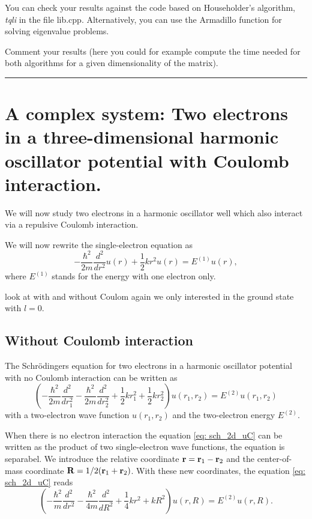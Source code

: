 \documentclass[11pt,a4wide]{article}
\begin{document}
You can check your results against the code based
on Householder's algorithm, {\em tqli} in the file lib.cpp. Alternatively, you can use the Armadillo function for solving 
eigenvalue problems. 

Comment your results (here you could for example compute the time needed for 
both algorithms for a given dimensionality of the matrix).  

\noindent\rule{\textwidth}{1pt}

\section{A complex system: Two electrons in a three-dimensional harmonic oscillator potential with Coulomb interaction.}
We will now study two electrons in a harmonic oscillator well which also interact via a repulsive Coulomb interaction.


We will now rewrite the single-electron equation as
\[
  -\frac{\hbar^2}{2 m} \frac{d^2}{dr^2} u(r) 
       + \frac{1}{2}k r^2u(r)  = E^{(1)} u(r),
\]
where $E^{(1)}$ stands for the energy with one electron only.

look at with and without Coulom
again we only interested in the ground state with $l=0$. 


\subsection{Without Coulomb interaction}
The Schr\"odingers equation for two electrons in a harmonic oscillator potential with no Coulomb interaction can be written as
\begin{equation}
\left(  -\frac{\hbar^2}{2 m} \frac{d^2}{dr_1^2} -\frac{\hbar^2}{2 m} \frac{d^2}{dr_2^2}+ \frac{1}{2}k r_1^2+ \frac{1}{2}k r_2^2\right)u(r_1,r_2)  = E^{(2)} u(r_1,r_2) 
\label{eq: sch_2d_uC}
\end{equation}
with a two-electron wave function $u(r_1,r_2)$ and the two-electron energy $E^{(2)}$.

When there is no electron interaction the equation \ref{eq: sch_2d_uC} can be written as the product of two single-electron wave functions, the equation is separabel. We introduce the relative coordinate ${\bf r} = {\bf r}_1-{\bf r}_2$ and the center-of-mass coordinate ${\bf R} = 1/2({\bf r}_1+{\bf r}_2)$. With these new coordinates, the equation \ref{eq: sch_2d_uC} reads
\[
\left(  -\frac{\hbar^2}{m} \frac{d^2}{dr^2} -\frac{\hbar^2}{4 m} \frac{d^2}{dR^2}+ \frac{1}{4} k r^2+  kR^2\right)u(r,R)  = E^{(2)} u(r,R).
\]
\end{document}
